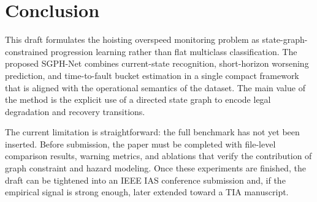 \section{Conclusion}
\label{sec:conclusion}

This draft formulates the hoisting overspeed monitoring problem as state-graph-constrained progression learning rather than flat multiclass classification. The proposed SGPH-Net combines current-state recognition, short-horizon worsening prediction, and time-to-fault bucket estimation in a single compact framework that is aligned with the operational semantics of the dataset. The main value of the method is the explicit use of a directed state graph to encode legal degradation and recovery transitions.

The current limitation is straightforward: the full benchmark has not yet been inserted. Before submission, the paper must be completed with file-level comparison results, warning metrics, and ablations that verify the contribution of graph constraint and hazard modeling. Once these experiments are finished, the draft can be tightened into an IEEE IAS conference submission and, if the empirical signal is strong enough, later extended toward a TIA manuscript.
